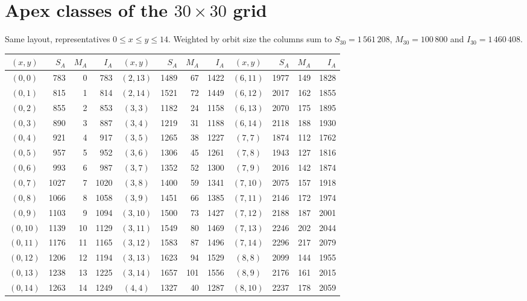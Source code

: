 \documentclass[11pt,a4paper]{article}
\theoremstyle{remark}
\begin{document}
\clearpage
\section{Apex classes of the $30\times30$ grid}\label{app:30}

Same layout, representatives $0\le x\le y\le14$. Weighted by orbit size the
columns sum to $S_{30}=1\,561\,208$, $M_{30}=100\,800$ and $I_{30}=1\,460\,408$.

\begin{center}
\small
\begin{tabular}{crrr@{\quad}crrr@{\quad}crrr}
\toprule
$(x,y)$ & $S_A$ & $M_A$ & $I_A$ & $(x,y)$ & $S_A$ & $M_A$ & $I_A$ &
$(x,y)$ & $S_A$ & $M_A$ & $I_A$\\
\midrule
$(0,0)$ & 783 & 0 & 783 & $(2,13)$ & 1489 & 67 & 1422 & $(6,11)$ & 1977 & 149 & 1828 \\
$(0,1)$ & 815 & 1 & 814 & $(2,14)$ & 1521 & 72 & 1449 & $(6,12)$ & 2017 & 162 & 1855 \\
$(0,2)$ & 855 & 2 & 853 & $(3,3)$ & 1182 & 24 & 1158 & $(6,13)$ & 2070 & 175 & 1895 \\
$(0,3)$ & 890 & 3 & 887 & $(3,4)$ & 1219 & 31 & 1188 & $(6,14)$ & 2118 & 188 & 1930 \\
$(0,4)$ & 921 & 4 & 917 & $(3,5)$ & 1265 & 38 & 1227 & $(7,7)$ & 1874 & 112 & 1762 \\
$(0,5)$ & 957 & 5 & 952 & $(3,6)$ & 1306 & 45 & 1261 & $(7,8)$ & 1943 & 127 & 1816 \\
$(0,6)$ & 993 & 6 & 987 & $(3,7)$ & 1352 & 52 & 1300 & $(7,9)$ & 2016 & 142 & 1874 \\
$(0,7)$ & 1027 & 7 & 1020 & $(3,8)$ & 1400 & 59 & 1341 & $(7,10)$ & 2075 & 157 & 1918 \\
$(0,8)$ & 1066 & 8 & 1058 & $(3,9)$ & 1451 & 66 & 1385 & $(7,11)$ & 2146 & 172 & 1974 \\
$(0,9)$ & 1103 & 9 & 1094 & $(3,10)$ & 1500 & 73 & 1427 & $(7,12)$ & 2188 & 187 & 2001 \\
$(0,10)$ & 1139 & 10 & 1129 & $(3,11)$ & 1549 & 80 & 1469 & $(7,13)$ & 2246 & 202 & 2044 \\
$(0,11)$ & 1176 & 11 & 1165 & $(3,12)$ & 1583 & 87 & 1496 & $(7,14)$ & 2296 & 217 & 2079 \\
$(0,12)$ & 1206 & 12 & 1194 & $(3,13)$ & 1623 & 94 & 1529 & $(8,8)$ & 2099 & 144 & 1955 \\
$(0,13)$ & 1238 & 13 & 1225 & $(3,14)$ & 1657 & 101 & 1556 & $(8,9)$ & 2176 & 161 & 2015 \\
$(0,14)$ & 1263 & 14 & 1249 & $(4,4)$ & 1327 & 40 & 1287 & $(8,10)$ & 2237 & 178 & 2059 \\

\end{tabular}
\end{center}
\end{document}

